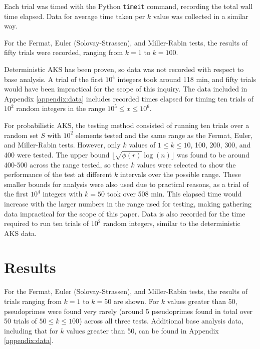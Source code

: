 \documentclass{article}
\begin{document}
Each trial was timed with the Python \texttt{timeit} command, recording the total wall time elapsed. Data for average time taken per $k$ value was collected in a similar way. 

For the Fermat, Euler (Solovay-Strassen), and Miller-Rabin tests, the results of fifty trials were recorded, ranging from $k = 1$ to $k = 100$.

Deterministic AKS has been proven, so data was not recorded with respect to base analysis. A trial of the first $10^4$ integers took around 118 min, and fifty trials would have been impractical for the scope of this inquiry. The data included in Appendix \ref{appendix:data} includes recorded times elapsed for timing ten trials of $10^2$ random integers in the range $10^5 \leq x \leq 10^6$.

For probabilistic AKS, the testing method consisted of running ten trials over a random set $S$ with $10^2$ elements tested and the same range as the Fermat, Euler, and Miller-Rabin tests. However, only $k$ values of $1 \leq k \leq 10$, 100, 200, 300, and 400 were tested. The upper bound $\lfloor \sqrt{\phi(r)}\log(n) \rfloor$ was found to be around 400-500 across the range tested, so these $k$ values were selected to show the performance of the test at different $k$ intervals over the possible range. These smaller bounds for analysis were also used due to practical reasons, as a trial of the first $10^4$ integers with $k = 50$ took over 508 min. This elapsed time would increase with the larger numbers in the range used for testing, making gathering data impractical for the scope of this paper. Data is also recorded for the time required to run ten trials of $10^2$ random integers, similar to the deterministic AKS data.


\section{Results}
For the Fermat, Euler (Solovay-Strassen), and Miller-Rabin tests, the results of trials ranging from $k = 1$ to $k = 50$ are shown. For $k$ values greater than 50, pseudoprimes were found very rarely (around 5 pseudoprimes found in total over 50 trials of $50 \leq k \leq 100$) across all three tests. Additional base analysis data, including that for $k$ values greater than 50, can be found in Appendix \ref{appendix:data}. 
\end{document}

